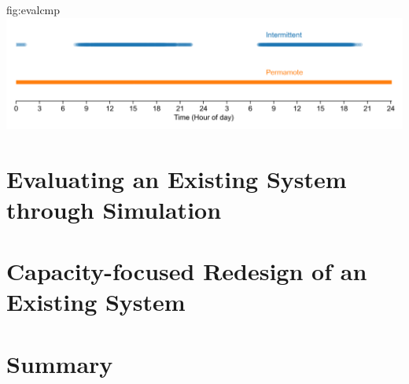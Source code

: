 \begin{definefigure}{fig:evalcmp}
    \centering
    \includegraphics[width=\linewidth]{figs/capacity/experiment_sys_compare/exp_packets_recv}
    \caption{
      \normalfont
        Packets received over two days.
      This figure compares the reliability of an
      intermittent design and \name. \name sends a packet every second and does
      so without fail, while the intermittent system is only able to send when
      light is available.
      }
\end{definefigure}


\section{Evaluating an Existing System through Simulation}

\section{Capacity-focused Redesign of an Existing System}


\section{Summary}